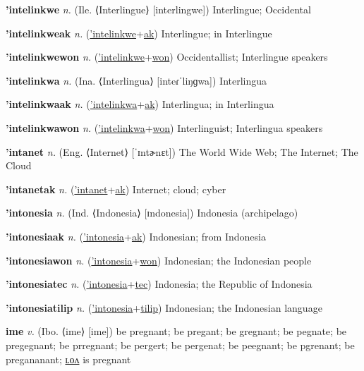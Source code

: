 \textbf{\hypertarget{'intelinkwe}{'intelinkwe}} \textit{n.} (Ile. ⟨Interlingue⟩ [interlingwe])
Interlingue; Occidental

\textbf{\hypertarget{'intelinkweak}{'intelinkweak}} \textit{n.} (\hyperlink{'intelinkwe}{'intelinkwe}+\allowbreak \hyperlink{ak}{ak})
Interlingue; in Interlingue

\textbf{\hypertarget{'intelinkwewon}{'intelinkwewon}} \textit{n.} (\hyperlink{'intelinkwe}{'intelinkwe}+\allowbreak \hyperlink{won}{won})
Occidentallist; Interlingue speakers

\textbf{\hypertarget{'intelinkwa}{'intelinkwa}} \textit{n.} (Ina. ⟨Interlingua⟩ [inteɾˈliŋɡwa])
Interlingua

\textbf{\hypertarget{'intelinkwaak}{'intelinkwaak}} \textit{n.} (\hyperlink{'intelinkwa}{'intelinkwa}+\allowbreak \hyperlink{ak}{ak})
Interlingua; in Interlingua

\textbf{\hypertarget{'intelinkwawon}{'intelinkwawon}} \textit{n.} (\hyperlink{'intelinkwa}{'intelinkwa}+\allowbreak \hyperlink{won}{won})
Interlinguist; Interlingua speakers

\textbf{\hypertarget{'intanet}{'intanet}} \textit{n.} (Eng. ⟨Internet⟩ [ˈɪntɚnɛt])
The World Wide Web; The Internet; The Cloud

\textbf{\hypertarget{'intanetak}{'intanetak}} \textit{n.} (\hyperlink{'intanet}{'intanet}+\allowbreak \hyperlink{ak}{ak})
Internet; cloud; cyber

\textbf{\hypertarget{'intonesia}{'intonesia}} \textit{n.} (Ind. ⟨Indonesia⟩ [ɪndonesia])
Indonesia (archipelago)

\textbf{\hypertarget{'intonesiaak}{'intonesiaak}} \textit{n.} (\hyperlink{'intonesia}{'intonesia}+\allowbreak \hyperlink{ak}{ak})
Indonesian; from Indonesia

\textbf{\hypertarget{'intonesiawon}{'intonesiawon}} \textit{n.} (\hyperlink{'intonesia}{'intonesia}+\allowbreak \hyperlink{won}{won})
Indonesian; the Indonesian people

\textbf{\hypertarget{'intonesiatec}{'intonesiatec}} \textit{n.} (\hyperlink{'intonesia}{'intonesia}+\allowbreak \hyperlink{tec}{tec})
Indonesia; the Republic of Indonesia

\textbf{\hypertarget{'intonesiatilip}{'intonesiatilip}} \textit{n.} (\hyperlink{'intonesia}{'intonesia}+\allowbreak \hyperlink{tilip}{tilip})
Indonesian; the Indonesian language

\textbf{\hypertarget{ime}{ime}} \textit{v.} (Ibo. ⟨ime⟩ [ime])
be pregnant; be pregant; be gregnant; be pegnate; be pregegnant; be prregnant; be pergert; be pergenat; be peegnant; be pgrenant; be pregananant; \hyperlink{imelon}{ʟᴏᴧ} is pregnant

